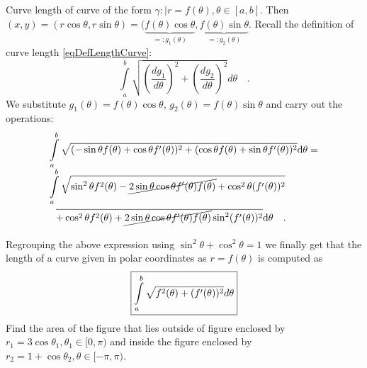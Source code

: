 \documentclass[12pt]{book}
\begin{document}
Curve length of curve of the form $\gamma:|r=f(\theta),\theta\in [a,b]$. Then $(x,y)= (r\cos\theta, r\sin \theta)= (\underbrace{f(\theta)\cos\theta}_{=:g_1(\theta)}, \underbrace{ f(\theta)\sin\theta}_{=:g_2(\theta)} $. Recall the definition of curve length \eqref{eqDefLengthCurve}:
\[
\int\limits_{a}^b\sqrt{\left(\frac{dg_1}{d\theta}\right)^2+\left(\frac{dg_2}{d\theta}\right)^2}d\theta \quad.
\]
We substitute $g_1(\theta)=f(\theta)\cos\theta$, $g_2(\theta)=f(\theta)\sin\theta$ and carry out the operations:
\[
\begin{array}{l}
\displaystyle\int\limits_{a}^b\sqrt{ (-\sin\theta f(\theta) + \cos\theta f'(\theta) )^2+(\cos\theta f(\theta)+\sin \theta f'(\theta) )^2}{\normalfont \text{d}}\theta=\\
\displaystyle \int \limits_{a}^b \sqrt{\sin^2\theta f^2(\theta)- \cancel{2\sin\theta\cos\theta f'(\theta)f(\theta)}+\cos^2\theta (f'(\theta))^2}\\
\phantom{\int\limits_a^b} \overline{+ \cos^2\theta f^2(\theta)+\cancel{2\sin\theta\cos\theta f'(\theta)f(\theta)} \sin^2 (f'(\theta))^2 }{\normalfont \text{d}}\theta\quad .
\end{array}
\]
Regrouping the above expression using $\sin^2\theta+\cos^2\theta=1$ we finally get that the length of a curve given in polar coordinates as $r=f(\theta)$ is computed as
\begin{equation}\boxed{\label{eqCurveLengthPolarCoords}
\int\limits_{a}^b \sqrt{f^2(\theta)+ (f'(\theta))^2}d\theta
}
\end{equation}
Find the area of the figure that lies outside of figure enclosed by $r_1=3\cos\theta_1, \theta_1\in [0,\pi)$ and inside the figure enclosed by $r_2=1+\cos\theta_2, \theta\in [-\pi,\pi)$. %
\end{document}
